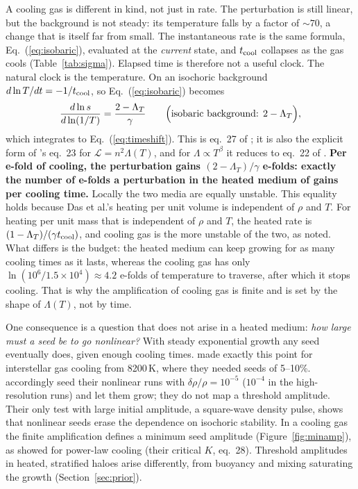 \documentclass[11pt]{article}
\newcommand{\tcool}{t_{\rm cool}}
\newcommand{\LT}{\Lambda_T}
\newcommand{\drho}{\delta\rho/\rho}
\begin{document}
A cooling gas is different in kind, not just in rate. The perturbation is still
linear, but the background is not steady: its temperature falls by a factor of
$\sim70$, a change that is itself far from small. The instantaneous rate is the
same formula, Eq.~(\ref{eq:isobaric}), evaluated at the \emph{current} state, and
$\tcool$ collapses as the gas cools (Table~\ref{tab:sigma}). Elapsed time is
therefore not a useful clock. The natural clock is the temperature. On an
isochoric background $d\ln T/dt=-1/\tcool$, so Eq.~(\ref{eq:isobaric}) becomes
\begin{equation}
\frac{d\ln s}{d\ln(1/T)}=\frac{2-\LT}{\gamma}
\qquad\Bigl(\text{isobaric background: }2-\LT\Bigr),
\label{eq:perefold}
\end{equation}
which integrates to Eq.~(\ref{eq:timeshift}). This is eq.~27 of \citet{schwarz72}; it is also the explicit form of
\citet{balbus86}'s eq.~23 for $\mathcal{L}=n^2\Lambda(T)$, and for $\Lambda\propto
T^\beta$ it reduces to eq.~22 of \citet{burkert00}. \textbf{Per e-fold of cooling, the
perturbation gains $(2-\LT)/\gamma$ e-folds: exactly the number of e-folds a
perturbation in the heated medium of \citet{das21} gains per cooling time.} Locally
the two media are equally unstable. This equality holds because Das et al.'s heating
per unit volume is independent of $\rho$ and $T$. For heating per unit mass that is
independent of $\rho$ and $T$, the heated rate is $(1-\LT)/(\gamma\tcool)$, and cooling
gas is the more unstable of the two, as \citet{field65} noted. What differs is the budget: the heated medium can keep
growing for as many cooling times as it lasts, whereas the cooling gas has only
$\ln(10^6/1.5\times10^4)\approx4.2$ e-folds of temperature to traverse, after which
it stops cooling. That is why the amplification of cooling gas is finite and is
set by the shape of $\Lambda(T)$, not by time.

One consequence is a question that does not arise in a heated medium: \emph{how
large must a seed be to go nonlinear?} With steady exponential growth any seed
eventually does, given enough cooling times. \citet{schwarz72} made exactly this
point for interstellar gas cooling from 8200\,K, where they needed seeds of
5--10\%. \citet{das21} accordingly seed their
nonlinear runs with $\drho=10^{-5}$ ($10^{-4}$ in the high-resolution runs) and let
them grow; they do not map a threshold amplitude. Their only test with large
initial amplitude, a square-wave density pulse, shows that nonlinear seeds erase
the dependence on isochoric stability. In a cooling gas the finite amplification
defines a minimum seed amplitude (Figure~\ref{fig:minamp}), as \citet{burkert00}
showed for power-law cooling (their critical $K$, eq.~28). Threshold amplitudes in
heated, stratified haloes \citep{sharma12,choudhury19} arise differently, from
buoyancy and mixing saturating the growth (Section~\ref{sec:prior}).
\end{document}
